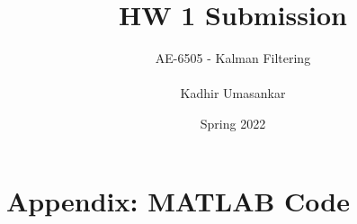 \documentclass[12pt]{report}
\author{AE-6505 - Kalman Filtering \\\\ Kadhir Umasankar}
\title{HW 1 Submission}
\date{Spring 2022}
\newlength{\originalVOffset}
\newlength{\originalHOffset}
\theoremstyle{definition}
\begin{document}
\maketitle

\setlength{\voffset}{-0.1cm}
\setlength{\hoffset}{-0.1cm}

\setlength{\voffset}{\originalVOffset}
\setlength{\hoffset}{\originalHOffset}

\section{Appendix: MATLAB Code}
\inputminted[linenos=true, breaklines=true, breakanywhere=true, fontsize=\scriptsize]{MATLAB}{../hw1.m}
\end{document}

